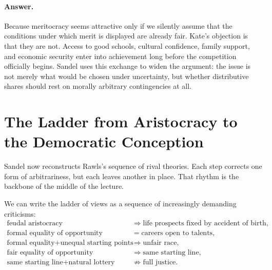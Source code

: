 \paragraph{Answer.} Because meritocracy seems attractive only if we silently assume that the conditions under which merit is displayed are already fair. Kate's objection is that they are not. Access to good schools, cultural confidence, family support, and economic security enter into achievement long before the competition officially begins. Sandel uses this exchange to widen the argument: the issue is not merely what would be chosen under uncertainty, but whether distributive shares should rest on morally arbitrary contingencies at all.

\section{The Ladder from Aristocracy to the Democratic Conception}

Sandel now reconstructs Rawls's sequence of rival theories. Each step corrects one form of arbitrariness, but each leaves another in place. That rhythm is the backbone of the middle of the lecture.

We can write the ladder of views as a sequence of increasingly demanding criticisms:
\begin{align}
\text{feudal aristocracy} &\Longrightarrow \text{life prospects fixed by accident of birth},\\
\text{formal equality of opportunity} &= \text{careers open to talents},\\
\text{formal equality}+\text{unequal starting points} &\Longrightarrow \text{unfair race},\\
\text{fair equality of opportunity} &\Longrightarrow \text{same starting line},\\
\text{same starting line}+\text{natural lottery} &\not\Longrightarrow \text{full justice}.
\end{align}

\begin{figure}[h]
\centering
{}
\end{figure}

